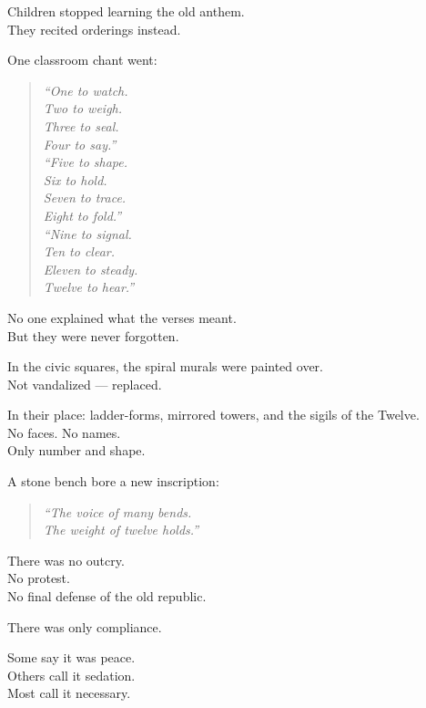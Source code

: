 \documentclass[9pt]{article}
\begin{document}
Children stopped learning the old anthem.\\
They recited orderings instead.

One classroom chant went:

\begin{quote}
\textit{“One to watch.}\\
\textit{Two to weigh.}\\
\textit{Three to seal.}\\
\textit{Four to say.”}\\

\textit{“Five to shape.}\\
\textit{Six to hold.}\\
\textit{Seven to trace.}\\
\textit{Eight to fold.”}\\

\textit{“Nine to signal.}\\
\textit{Ten to clear.}\\
\textit{Eleven to steady.}\\
\textit{Twelve to hear.”}
\end{quote}

No one explained what the verses meant.\\
But they were never forgotten.

\vspace{1em}

In the civic squares, the spiral murals were painted over.\\
Not vandalized — replaced.

In their place: ladder-forms, mirrored towers, and the sigils of the Twelve.\\
No faces. No names.\\
Only number and shape.

A stone bench bore a new inscription:

\begin{quote}
\textit{“The voice of many bends.}\\
\textit{The weight of twelve holds.”}
\end{quote}

\vspace{1em}

There was no outcry.\\
No protest.\\
No final defense of the old republic.

There was only compliance.

Some say it was peace.\\
Others call it sedation.\\
Most call it necessary.
\end{document}
